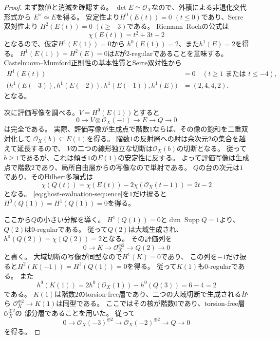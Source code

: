 \documentclass[a4paper,11pt]{ltjsarticle}
\numberwithin{equation}{section}
\theoremstyle{plain}
\theoremstyle{definition}
\theoremstyle{remark}
\begin{document}
\begin{proof}
まず数値と消滅を確認する。
$\det E\simeq\mathcal O_X$なので、外積による非退化交代形式から
$E^\vee\simeq E$を得る。
安定性より$H^0(E(t))=0$ $(t\leq0)$であり、Serre双対性より
$H^2(E(t))=0$ $(t\geq-3)$である。
Riemann--Rochの公式は
\[
 \chi(E(t))=t^2+3t-2
\]
となるので、仮定$H^1(E(1))=0$から
$h^0(E(1))=2$、また$h^1(E)=2$を得る。
$H^1(E(1))=H^2(E)=0$は$E$が$2$-regularであることを意味する。
Castelnuovo--Mumford正則性の基本性質とSerre双対性から
\begin{equation}
\label{eq:ghost-cohomology-range}
 \begin{aligned}
 H^1(E(t))&=0\quad(t\geq1\text{ または }t\leq-4),\\
 \bigl(h^1(E(-3)),h^1(E(-2)),h^1(E(-1)),h^1(E)\bigr)
 &=(2,4,4,2).
 \end{aligned}
\end{equation}
となる。

次に評価写像を調べる。$V=H^0(E(1))$とすると
\begin{equation}
\label{eq:ghost-evaluation-sequence}
 0\longrightarrow V\otimes\mathcal O_X(-1)
 \longrightarrow E\longrightarrow Q\longrightarrow0
\end{equation}
は完全である。
実際、評価写像が生成点で階数$1$ならば、その像の飽和を二重双対化して
$\mathcal O_X(b)\subseteq E(1)$を得る。
階数$1$の反射層への射は余次元$2$の集合を越えて延長するので、
$V$の二つの線形独立な切断は$\mathcal O_X(b)$の切断となる。
従って$b\geq1$であるが、これは傾き$1$の$E(1)$の安定性に反する。
よって評価写像は生成点で階数$2$であり、局所自由層からの写像なので単射である。
$Q$の台の次元は$1$であり、そのHilbert多項式は
\[
 \chi(Q(t))=\chi(E(t))-2\chi(\mathcal O_X(t-1))=2t-2
\]
となる。
\eqref{eq:ghost-evaluation-sequence}を$1$だけ捩ると
$H^0(Q(1))=H^1(Q(1))=0$を得る。

ここから$Q$の小さい分解を導く。
$H^1(Q(1))=0$と$\dim\operatorname{Supp}Q=1$より、$Q(2)$は$0$-regularである。
従って$Q(2)$は大域生成され、$h^0(Q(2))=\chi(Q(2))=2$となる。
その評価列を
\[
 0\longrightarrow K\longrightarrow\mathcal O_X^{\oplus2}
 \longrightarrow Q(2)\longrightarrow0
\]
と書く。
大域切断の写像が同型なので$H^1(K)=0$であり、
この列を$-1$だけ捩ると$H^2(K(-1))=H^1(Q(1))=0$を得る。
従って$K(1)$も$0$-regularである。
また
\[
 h^0(K(1))=2h^0(\mathcal O_X(1))-h^0(Q(3))=6-4=2
\]
である。
$K(1)$は階数$2$のtorsion-free層であり、二つの大域切断で生成されるから
$\mathcal O_X^{\oplus2}\to K(1)$は同型である。
ここではその核が階数$0$であり、torsion-free層$\mathcal O_X^{\oplus2}$の
部分層であることを用いた。
従って
\begin{equation}
\label{eq:ghost-evaluation-cokernel-resolution}
 0\longrightarrow\mathcal O_X(-3)^{\oplus2}
 \longrightarrow\mathcal O_X(-2)^{\oplus2}
 \longrightarrow Q\longrightarrow0
\end{equation}
を得る。


\end{proof}
\end{document}
